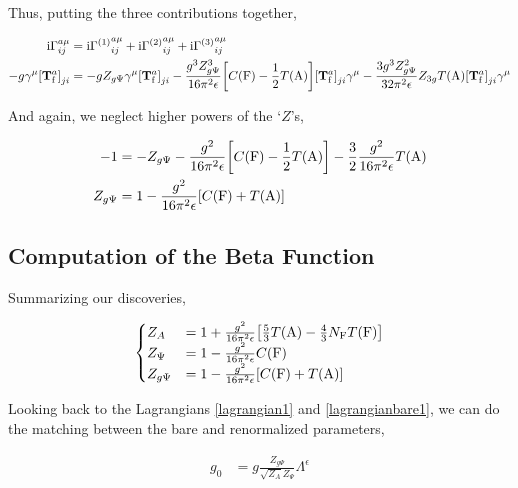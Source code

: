 Thus, putting the three contributions together,

\begin{align}
    \textnormal{i}{\Gamma}^{a\mu}_{ij}&=\textnormal{i}{\Gamma^{\qty(1)}}^{a\mu}_{ij}+\textnormal{i}{\Gamma^{\qty(2)}}^{a\mu}_{ij}+\textnormal{i}{\Gamma^{\qty(3)}}^{a\mu}_{ij}\nonumber\\
    -g\gamma^\mu\qty[\vb T^a_{\textnormal{f}}]_{ji}&=-gZ_{g\Psi}\gamma^\mu\qty[\vb T^a_{\textnormal{f}}]_{ji}-\frac{g^3Z_{g\Psi}^3}{16\pi^2\epsilon} 
    \qty[C\qty(\textnormal F)-\frac12T\qty(\textnormal{A})]\qty[{\vb T^a_{\textnormal{f}}}]_{ji}\gamma^\mu-\frac{3g^3Z_{g\Psi}^2}{32\pi^2\epsilon}Z_{3g}
    T\qty(\textnormal A)\qty[\vb T^a_{\textnormal f}]_{ji}\gamma^\mu\nonumber
\end{align}

And again, we neglect higher powers of the `$Z$'s,

\begin{align}
    -1&=-Z_{g\Psi}-\frac{g^2}{16\pi^2\epsilon}\qty[C\qty(\textnormal F)-\frac12T\qty(\textnormal{A})]
    -\frac32\frac{g^2}{16\pi^2\epsilon}T\qty(\textnormal A)\nonumber\\
    Z_{g\Psi}&=1-\frac{g^2}{16\pi^2\epsilon}\qty[C\qty(\textnormal F)+T\qty(\textnormal{A})]\nonumber
\end{align}

\subsection{Computation of the Beta Function}

Summarizing our discoveries,

\begin{align}
    \begin{cases}
        Z_A&=1+\frac{g^2}{16\pi^2\epsilon}\qty[\frac{5}{3}T\qty(\textnormal{A})-\frac43N_{\textnormal{F}}T\qty(\textnormal{F})]\\
        Z_\Psi&=1-\frac{g^2}{16\pi^2\epsilon}C\qty(\textnormal{F})\\
        Z_{g\Psi}&=1-\frac{g^2}{16\pi^2\epsilon}\qty[C\qty(\textnormal F)+T\qty(\textnormal{A})]
    \end{cases}\nonumber
\end{align}

Looking back to the Lagrangians \ref{lagrangian1} and \ref{lagrangianbare1}, we can do the matching between 
the bare and renormalized parameters,

\begin{align}
    g_0&=g\frac{Z_{g\Psi}}{\sqrt{Z_A}Z_{\Psi}}\Lambda^\epsilon\nonumber
\end{align}

